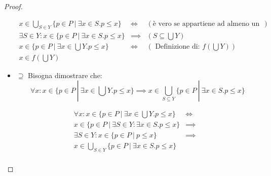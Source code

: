 \begin{proof}
\begin{itemize}
	$$
	\begin{array}{llr}
	x \in \bigcup_{S \in Y} \{p \in P\ |\ \exists x \in S. p \leq x\} & \iff & (\text{è vero se appartiene ad almeno un sottinsieme di Y})\\
	\exists S \in Y: x \in \{p \in P\ |\ \exists x \in S. p \leq x\} & \implies & (S \subseteq \bigcup Y)\\
	x \in \{p \in P\ |\ \exists x \in \bigcup Y. p \leq x \} & \iff & (\text{ Definizione di: } f(\bigcup Y)) \\
	x \in f(\bigcup Y)
	\end{array}
	$$
	\item $\boxed{\supseteq}$ Bisogna dimostrare che:
	$$
	\forall x : x \in \{p \in P\ |\ \exists x \in \bigcup Y. p \leq x\} \implies x \in 
	\bigcup_{S \subseteq Y} \{p \in P\ |\ \exists x \in S. p \leq x\} 
	$$ 
	
	$$
	\begin{array}{lll}
	\forall x : x \in \{p \in P\ |\ \exists x \in \bigcup Y. p \leq x\} & \iff & \\
	x \in \{p \in P\ |\ \exists S \in Y: \exists x \in S. p \leq x \} & \implies & \\
	\exists S \in Y : x \in \{p \in P\ |\ p \leq x \} & \implies & \\
	x \in \bigcup_{S \in Y} \{p \in P\ |\ \exists x \in S. p \leq x\} & & \\
	
	\end{array}
	$$
\end{itemize}



\end{proof}

\let\powerset\undefined

